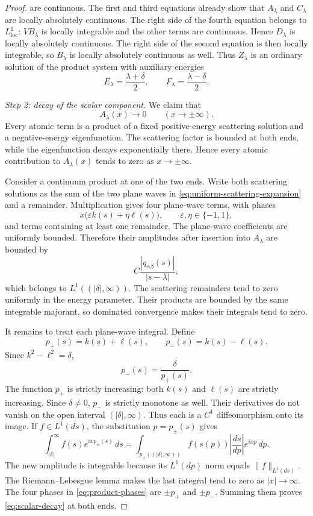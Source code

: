 \documentclass[11pt]{amsart}
\numberwithin{equation}{section}
\theoremstyle{remark}
\begin{document}
\begin{proof}
are continuous.  The first and third equations already show that $A_\lambda$
and $C_\lambda$ are locally absolutely continuous.  The right side of the
fourth equation belongs to $L^1_{\mathrm{loc}}$: $V B_\lambda$ is locally
integrable and the other terms are continuous.  Hence $D_\lambda$ is locally
absolutely continuous.  The right side of the second equation is then locally
integrable, so $B_\lambda$ is locally absolutely continuous as well.  Thus
$Z_\lambda$ is an ordinary solution of the product system with auxiliary
energies
\begin{equation}
 E_\lambda=\frac{\lambda+\delta}{2},
 \qquad
 F_\lambda=\frac{\lambda-\delta}{2}.
 \label{eq:auxiliary-energies}
\end{equation}

\smallskip
\noindent
\emph{Step 2: decay of the scalar component.}
We claim that
\begin{equation}
 A_\lambda(x)\longrightarrow0
 \qquad (x\to\pm\infty).
 \label{eq:scalar-decay}
\end{equation}
Every atomic term is a product of a fixed positive-energy scattering solution
and a negative-energy eigenfunction.  The scattering factor is bounded at
both ends, while the eigenfunction decays exponentially there.  Hence every
atomic contribution to $A_\lambda(x)$ tends to zero as $x\to\pm\infty$.

Consider a continuum product at one of the two ends.  Write both scattering
solutions as the sum of the two plane waves in
\eqref{eq:uniform-scattering-expansion} and a remainder.  Multiplication gives
four plane-wave terms, with phases
\begin{equation}
 x\bigl(\varepsilon k(s)+\eta\ell(s)\bigr),
 \qquad \varepsilon,\eta\in\{-1,1\},
 \label{eq:product-phases}
\end{equation}
and terms containing at least one remainder.  The plane-wave coefficients are
uniformly bounded.  Therefore their amplitudes after insertion into
$A_\lambda$ are bounded by
\[
 C\frac{|q_{\alpha\beta}(s)|}{|s-\lambda|},
\]
which belongs to $L^1((|\delta|,\infty))$.  The scattering remainders tend to
zero uniformly in the energy parameter.  Their products are bounded by the
same integrable majorant, so dominated convergence makes their integrals tend
to zero.

It remains to treat each plane-wave integral.  Define
\[
 p_+(s)=k(s)+\ell(s),
 \qquad
 p_-(s)=k(s)-\ell(s).
\]
Since $k^2-\ell^2=\delta$,
\[
 p_-(s)=\frac{\delta}{p_+(s)}.
\]
The function $p_+$ is strictly increasing: both $k(s)$ and $\ell(s)$ are
strictly increasing.  Since $\delta\ne0$, $p_-$ is strictly monotone as well.
Their derivatives do not vanish on the open interval
$(|\delta|,\infty)$.  Thus each is a $C^1$ diffeomorphism onto its image.
If $f\in L^1(ds)$, the substitution $p=p_\pm(s)$ gives
\[
 \int_{|\delta|}^\infty f(s)e^{ixp_\pm(s)}\,ds
 =\int_{p_\pm((|\delta|,\infty))}
 f(s(p))\left|\frac{ds}{dp}\right|e^{ixp}\,dp.
\]
The new amplitude is integrable because its $L^1(dp)$ norm equals
$\|f\|_{L^1(ds)}$.  The Riemann--Lebesgue lemma makes the last integral tend
to zero as $|x|\to\infty$.  The four phases in
\eqref{eq:product-phases} are $\pm p_+$ and $\pm p_-$.  Summing them proves
\eqref{eq:scalar-decay} at both ends.


\end{proof}
\end{document}
